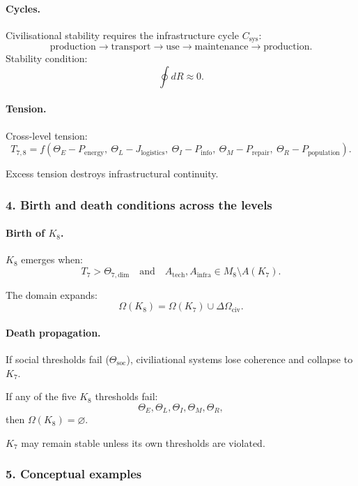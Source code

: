 \paragraph{Cycles.}
Civilisational stability requires the infrastructure cycle $C_{\mathrm{sys}}$:
\[
\text{production} \rightarrow \text{transport} \rightarrow
\text{use} \rightarrow \text{maintenance} \rightarrow \text{production}.
\]
Stability condition:
\[
\oint dR \approx 0.
\]

\paragraph{Tension.}
Cross-level tension:
\[
T_{7,8} =
f(\Theta_E - P_{\mathrm{energy}},\
  \Theta_L - J_{\mathrm{logistics}},\
  \Theta_I - P_{\mathrm{info}},\
  \Theta_M - P_{\mathrm{repair}},\
  \Theta_R - P_{\mathrm{population}}).
\]

Excess tension destroys infrastructural continuity.

\subsubsection{4. Birth and death conditions across the levels}

\paragraph{Birth of \texorpdfstring{$K_8$}{K_8}.}
$K_8$ emerges when:
\[
T_7 > \Theta_{7,\mathrm{dim}}
\quad\text{and}\quad
A_{\mathrm{tech}}, A_{\mathrm{infra}} \in M_8 \setminus A(K_7).
\]

The domain expands:
\[
\Omega(K_8) = \Omega(K_7) \cup \Delta\Omega_{\mathrm{civ}}.
\]

\paragraph{Death propagation.}
If social thresholds fail ($\Theta_{\mathrm{soc}}$), civiliational systems lose
coherence and collapse to $K_7$.

If any of the five $K_8$ thresholds fail:
\[
\Theta_E,\Theta_L,\Theta_I,\Theta_M,\Theta_R,
\]
then $\Omega(K_8)=\varnothing$.

$K_7$ may remain stable unless its own thresholds are violated.

\subsubsection{5. Conceptual examples}

